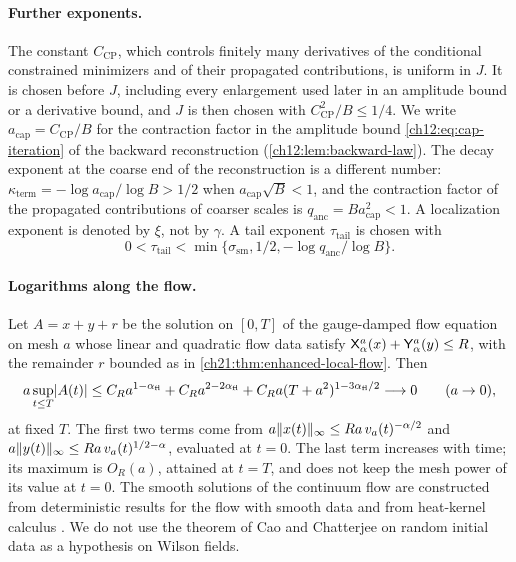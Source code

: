 \paragraph{Further exponents.}
The constant $C_{\mathrm{CP}}$, which controls finitely many derivatives of the conditional constrained minimizers and of their propagated contributions, is uniform in $J$. It is chosen before $J$, including every enlargement used later in an amplitude bound or a derivative bound, and $J$ is then chosen with $C_{\mathrm{CP}}^2/B\le1/4$. We write $a_{\mathrm{cap}}=C_{\mathrm{CP}}/B$ for the contraction factor in the amplitude bound \eqref{ch12:eq:cap-iteration} of the backward reconstruction (\cref{ch12:lem:backward-law}). The decay exponent at the coarse end of the reconstruction is a different number: $\kappa_{\mathrm{term}}=-\log a_{\mathrm{cap}}/\log B>1/2$ when $a_{\mathrm{cap}}\sqrt B<1$, and the contraction factor of the propagated contributions of coarser scales is $q_{\mathrm{anc}}=Ba_{\mathrm{cap}}^2<1$. A localization exponent is denoted by $\xi$, not by $\gamma$. A tail exponent $\tau_{\mathrm{tail}}$ is chosen with
\[
 0<\tau_{\mathrm{tail}}<\min\{\sigma_{\mathrm{sm}},1/2,-\log q_{\mathrm{anc}}/\log B\}.
\]

\paragraph{Logarithms along the flow.}
Let $A=x+y+r$ be the solution on $[0,T]$ of the gauge-damped flow equation on mesh $a$ whose linear and quadratic flow data satisfy $\mathsf X_{\alpha}^{a}(x)+\mathsf Y_{\alpha}^{a}(y)\le R$, with the remainder $r$ bounded as in \cref{ch21:thm:enhanced-local-flow}. Then
\[
 a\sup_{t\le T}\lvert A(t)\rvert
 \le C_Ra^{1-\alpha_{\mathrm{fl}}}
       +C_Ra^{2-2\alpha_{\mathrm{fl}}}
       +C_Ra(T+a^2)^{1-3\alpha_{\mathrm{fl}}/2}\longrightarrow0\qquad(a\to0),
\]
at fixed $T$. The first two terms come from $a\lVert x(t)\rVert_\infty\le Ra\,v_a(t)^{-\alpha/2}$ and $a\lVert y(t)\rVert_\infty\le Ra\,v_a(t)^{1/2-\alpha}$, evaluated at $t=0$. The last term increases with time; its maximum is $O_R(a)$, attained at $t=T$, and does not keep the mesh power of its value at $t=0$. The smooth solutions of the continuum flow are constructed from deterministic results for the flow with smooth data and from heat-kernel calculus \cite[Theorem~1.2 and Lemma~1.3, p.~3; Lemmas~C.2--C.3, pp.~55--56; Corollary~C.6, p.~58; Lemmas~C.12--C.13, p.~61]{CCHeat2022v4}. We do not use the theorem of Cao and Chatterjee on random initial data as a hypothesis on Wilson fields.

